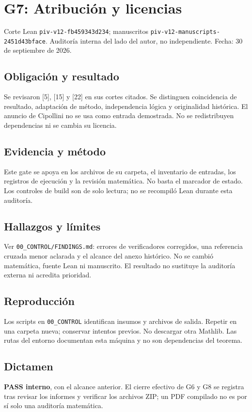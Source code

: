 \section{G7: Atribución y licencias}\label{g7-atribuciuxf3n-y-licencias}

Corte Lean \texttt{piv-v12-fb459343d234}; manuscritos
\texttt{piv-v12-manuscripts-2451d43bface}. Auditoría interna del lado
del autor, no independiente. Fecha: 30 de septiembre de 2026.

\subsection{Obligación y resultado}\label{obligaciuxf3n-y-resultado}

Se revisaron {[}5{]}, {[}15{]} y {[}22{]} en sus cortes citados. Se
distinguen coincidencia de resultado, adaptación de método,
independencia lógica y originalidad histórica. El anuncio de Cipollini
no se usa como entrada demostrada. No se redistribuyen dependencias ni
se cambia su licencia.

\subsection{Evidencia y método}\label{evidencia-y-muxe9todo}

Este gate se apoya en los archivos de su carpeta, el inventario de
entradas, los registros de ejecución y la revisión matemática. No basta
el marcador de estado. Los controles de build son de solo lectura; no se
recompiló Lean durante esta auditoría.

\subsection{Hallazgos y límites}\label{hallazgos-y-luxedmites}

Ver \texttt{00\_CONTROL/FINDINGS.md}: errores de verificadores
corregidos, una referencia cruzada menor aclarada y el alcance del anexo
histórico. No se cambió matemática, fuente Lean ni manuscrito. El
resultado no sustituye la auditoría externa ni acredita prioridad.

\subsection{Reproducción}\label{reproducciuxf3n}

Los scripts en \texttt{00\_CONTROL} identifican insumos y archivos de
salida. Repetir en una carpeta nueva; conservar intentos previos. No
descargar otra Mathlib. Las rutas del entorno documentan esta máquina y
no son dependencias del teorema.

\subsection{Dictamen}\label{dictamen}

\textbf{PASS interno}, con el alcance anterior. El cierre efectivo de G6
y G8 se registra tras revisar los informes y verificar los archivos ZIP;
un PDF compilado no es por sí solo una auditoría matemática.
